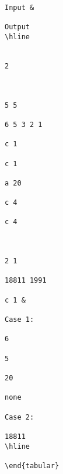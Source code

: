 \begin{verbatim}
Input & 

Output  
\hline


2

 

5 5

6 5 3 2 1

c 1

c 1

a 20

c 4

c 4

 

2 1

18811 1991

c 1 & 

Case 1:

6

5

20

none

Case 2:

18811  
\hline

\end{tabular}\end{verbatim}
